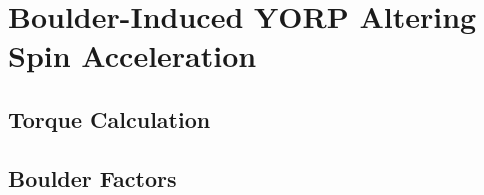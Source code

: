 \chapter{Boulder-Induced YORP Altering Spin Acceleration}
\label{yorp_spin}

\section{Torque Calculation}

\section{Boulder Factors}